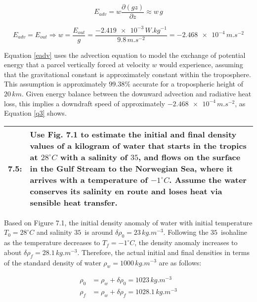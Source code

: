 \documentclass[12pt]{article}
\newcommand*{\problem}[2]{
    \begin{table}[ht]
    \centering
        \begin{tabular}{ | p{.1\linewidth} p{.9\linewidth} | }
            \hline
            \vspace{.3em}\textbf{\large#1:} & \vspace{.3em}\small{#2}\hspace{.2em}\vspace{.5em} \\ \hline
        \end{tabular}
    \end{table}
}
\begin{document}
\begin{equation}\label{eadv}
    E_{adv} = w \frac{\partial (gz)}{\partial z} \approx w\,g
\end{equation}

\begin{equation}\label{q3}
    E_{adv} = E_{out} \Rightarrow w  = \frac{E_{out}}{g} = \frac{\num{-2.419e-3}\,\si{W.kg^{-1}}}{9.8\,\si{m.s^{-2}}} = \num{-2.468e-4}\,\si{m.s^{-2}}
\end{equation}

Equation \ref{eadv} uses the advection equation to model the exchange of potential energy that a parcel vertically forced at velocity $w$ would experience, assuming that the gravitational constant is approximately constant within the troposphere. This assumption is approximately $99.38\%$ accurate for a tropospheric height of $20\,\si{km}$. Given energy balance between the downward advection and radiative heat loss, this implies a downdraft speed of approximately $\num{-2.468e-4}\,\si{m.s^{-2}}$, as Equation \ref{q3} shows.


\clearpage

\problem{7.5}{
    Use Fig. 7.1 to estimate the initial and final density values of a kilogram of water that starts in the tropics at $28^\circ C$ with a salinity of $35$\textperthousand, and flows on the surface in the Gulf Stream to the Norwegian Sea, where it arrives with a temperature of $-1^\circ C$. Assume the water conserves its salinity en route and loses heat via sensible heat transfer.
} %

Based on Figure 7.1, the initial density anomaly of water with initial temperature $T_0 = 28^\circ C$ and salinity $35$\textperthousand \, is around $\delta \rho_0 = 23 \,\si{kg.m^{-3}}$. Following the $35$\textperthousand \, isohaline as the temperature decreases to $T_f = -1^\circ C$, the density anomaly increases to about $\delta \rho_f = 28.1\, \si{kg.m^{-3}}$. Therefore, the actual initial and final densities in terms of the standard density of water $\rho_w = 1000\,\si{kg.m^{-3}}$ are as follows:

\begin{equation}
    \begin{split}
        \rho_0 &= \rho_w + \delta \rho_0 = 1023\,\si{kg.m^{-3}} \\
        \rho_f &= \rho_w + \delta \rho_f = 1028.1\,\si{kg.m^{-3}} \\
    \end{split}
\end{equation}
\end{document}
